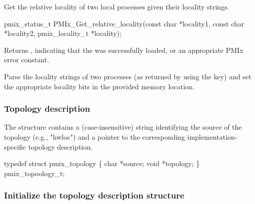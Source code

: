 \summary

Get the relative locality of two local processes given their locality strings.

\format

\cspecificstart
\begin{codepar}
pmix_status_t
PMIx_Get_relative_locality(const char *locality1,
                           const char *locality2,
                           pmix_locality_t *locality);
\end{codepar}
\cspecificend

\begin{arglist}
\end{arglist}

Returns , indicating that the  was successfully loaded, or an appropriate \ac{PMIx} error constant.

\descr

Parse the locality strings of two processes (as returned by  using the  key) and set the appropriate  locality bits in the provided memory location.

\subsubsection{Topology description}

The  structure contains a (case-insensitive)
string identifying the source of the topology (e.g., "hwloc") and a pointer
to the corresponding implementation-specific topology description.

\cspecificstart
\begin{codepar}
typedef struct pmix_topology \{
    char *source;
    void *topology;
\} pmix_topoology_t;
\end{codepar}
\cspecificend

\subsubsection{Initialize the topology description structure}

